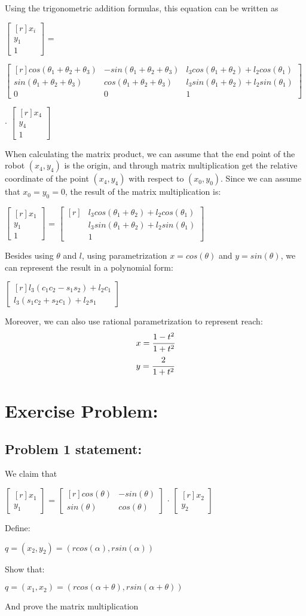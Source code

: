 \documentclass[11pt]{article}
\newcommand{\mat}[1]{
    $\begin{bmatrix*}[r]
        #1
    \end{bmatrix*}$
} %
\newcommand{\myalign}[1]{\begin{align*}#1\end{align*}}
\begin{document}
Using the trigonometric addition formulas, this equation can be written as
\begin{center}
  \mat{
    x_i \\
    y_1 \\
    1
  } =
  \mat{
    cos(\theta_1+\theta_2+\theta_3) & -sin(\theta_1+\theta_2+\theta_3) & l_3cos(\theta_1+\theta_2) + l_2cos(\theta_1) \\
    sin(\theta_1+\theta_2+\theta_3) & cos(\theta_1+\theta_2+\theta_3) & l_3sin(\theta_1+\theta_2) + l_2sin(\theta_1) \\
    0 & 0 & 1
  }
  $\cdot$ \mat{
    x_{4} \\
    y_{4} \\
    1
  }
\end{center}
When calculating the matrix product, we can assume that the end point of the robot $(x_4, y_4)$ is the origin,
and through matrix multiplication get the relative coordinate of the point $(x_4, y_4)$ with respect to $(x_0, y_0)$.
Since we can assume that $x_0 = y_0 = 0$, the result of the matrix multiplication is:
\begin{center}
  \mat{
    x_1 \\
    y_1 \\
    1
  } = \mat{
    & l_3cos(\theta_1 + \theta_2) + l_2cos(\theta_1) \\
    & l_3sin(\theta_1 + \theta_2) + l_2sin(\theta_1) \\
    & 1
  } \\
\end{center}
Besides using $\theta$ and $l$, using parametrization $x = cos(\theta)$ and $y = sin(\theta)$, we can represent the result in a polynomial form:
\begin{center}
  \mat{
    l_3(c_1c_2-s_1s_2) + l_2c_1\\
    l_3(s_1c_2+s_2c_1) + l_2s_1
  }
\end{center}
Moreover, we can also use rational parametrization to represent reach:
\myalign{
  & x = \cfrac{1-t^2}{1+t^2} \\
  & y = \cfrac{2}{1+t^2}
}
\section{Exercise Problem:}
\subsection{Problem 1 statement:}
We claim that \\
\begin{center}
  \mat{
    x_1 \\
    y_1
  } = \mat{
    cos(\theta) & -sin(\theta) \\
    sin(\theta) & cos(\theta)
  } $\cdot$ \mat{
    x_2 \\
    y_2
  }
\end{center}
Define:
\begin{center}
  $q = (x_2, y_2) = (rcos(\alpha), rsin(\alpha))$
\end{center}
Show that:
\begin{center}
  $q = (x_1, x_2) = (rcos(\alpha + \theta), rsin(\alpha + \theta))$
\end{center}
And prove the matrix multiplication
\end{document}
